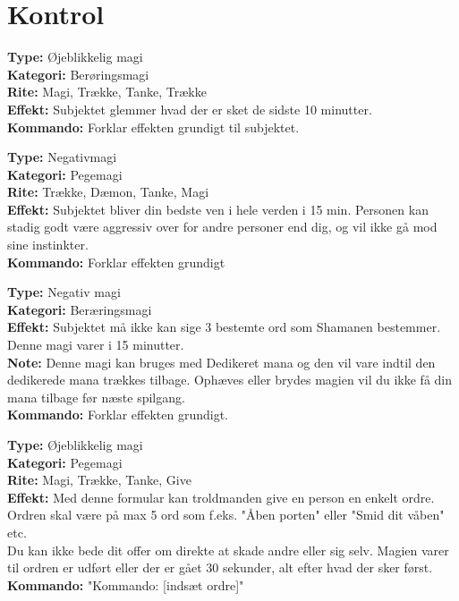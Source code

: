 \section{Kontrol}

\begin{kontrol*}[Glemsel]
\textbf{Type:} Øjeblikkelig magi\\
\textbf{Kategori:} Berøringsmagi\\
\textbf{Rite:} Magi, Trække, Tanke, Trække\\
\textbf{Effekt:} Subjektet glemmer hvad der er sket de sidste 10 minutter.\\
\textbf{Kommando:} Forklar effekten grundigt til subjektet.
\end{kontrol*}

\begin{kontrol*}[Venskab]
\textbf{Type:} Negativmagi\\
\textbf{Kategori:} Pegemagi\\
\textbf{Rite:} Trække, Dæmon, Tanke, Magi\\
\textbf{Effekt:} Subjektet bliver din bedste ven i hele verden i 15 min. Personen kan stadig godt være aggressiv over for andre personer end dig, og vil ikke gå mod sine instinkter.\\
\textbf{Kommando:} Forklar effekten grundigt
\end{kontrol*}

\begin{kontrol*}
\textbf{Type:} Negativ magi\\
\textbf{Kategori:} Beræringsmagi\\
\textbf{Effekt:} Subjektet må ikke kan sige 3 bestemte ord som Shamanen bestemmer. Denne magi varer i 15 minutter.\\
\textbf{Note:} Denne magi kan bruges med Dedikeret mana og den vil vare indtil den dedikerede mana trækkes tilbage. Ophæves eller brydes magien vil du ikke få din mana tilbage før næste spilgang.\\
\textbf{Kommando:} Forklar effekten grundigt.
\end{kontrol*}

\begin{kontrol*}[Kommando]
\textbf{Type:} Øjeblikkelig magi\\
\textbf{Kategori:} Pegemagi\\
\textbf{Rite:} Magi, Trække, Tanke, Give\\
\textbf{Effekt:} Med denne formular kan troldmanden give en person en enkelt ordre. Ordren skal være på max 5 ord som f.eks. "Åben porten" eller "Smid dit våben" etc. \\
Du kan ikke bede dit offer om direkte at skade andre eller sig selv. Magien varer til ordren er udført eller der er gået 30 sekunder, alt efter hvad der
sker først.\\
\textbf{Kommando:} "Kommando: [indsæt ordre]"
\end{kontrol*}